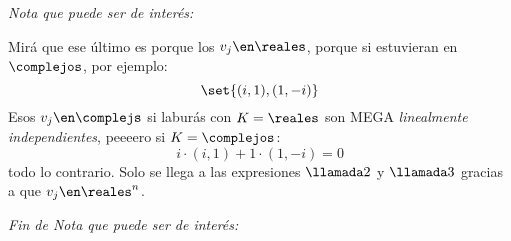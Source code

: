 \begin{itemize}
        \bigskip

        \textit{Nota que puede ser de interés:}

        Mirá que ese último \red{!!} es porque los $v_j \en \reales$, porque si estuvieran en $\complejos$, por ejemplo:
        $$
          \set{(i,1), (1,-i)}
        $$
        Esos $v_j \en \complejs$ si laburás con $K = \reales$ son {\large{MEGA}} \textit{linealmente independientes},
        peeeero si $K = \complejos$:
        $$
          i \cdot (i, 1) + 1 \cdot (1,-i) = 0
        $$
        todo lo contrario. Solo se llega a las expresiones $\llamada2$ y $\llamada3$ gracias a que $v_j \en \reales^n$.

        \textit{Fin de Nota que puede ser de interés:}
\end{itemize}

\begin{aportes}
  \item {}
\end{aportes}
